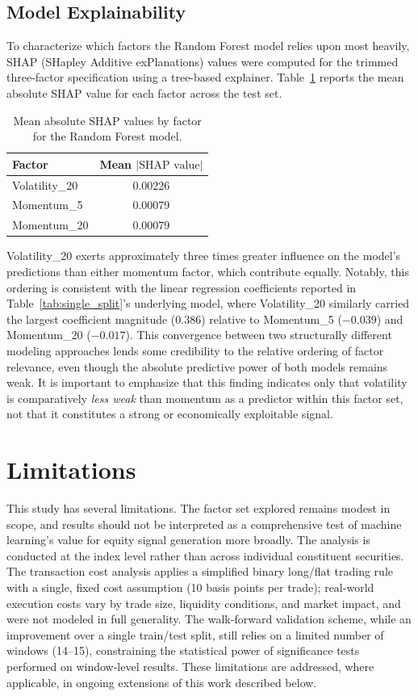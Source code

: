 \documentclass[11pt]{article}
\begin{document}
\subsection{Model Explainability}

To characterize which factors the Random Forest model relies upon most heavily, SHAP (SHapley Additive exPlanations) values were computed for the trimmed three-factor specification using a tree-based explainer. Table~\ref{tab:shap} reports the mean absolute SHAP value for each factor across the test set.

\begin{table}[h]
\centering
\begin{tabular}{lc}
\toprule
Factor & Mean $|\text{SHAP value}|$ \\
\midrule
Volatility\_20 & 0.00226 \\
Momentum\_5 & 0.00079 \\
Momentum\_20 & 0.00079 \\
\bottomrule
\end{tabular}
\caption{Mean absolute SHAP values by factor for the Random Forest model.}
\label{tab:shap}
\end{table}

Volatility\_20 exerts approximately three times greater influence on the model's predictions than either momentum factor, which contribute equally. Notably, this ordering is consistent with the linear regression coefficients reported in Table~\ref{tab:single_split}'s underlying model, where Volatility\_20 similarly carried the largest coefficient magnitude (0.386) relative to Momentum\_5 ($-0.039$) and Momentum\_20 ($-0.017$). This convergence between two structurally different modeling approaches lends some credibility to the relative ordering of factor relevance, even though the absolute predictive power of both models remains weak. It is important to emphasize that this finding indicates only that volatility is comparatively \emph{less weak} than momentum as a predictor within this factor set, not that it constitutes a strong or economically exploitable signal.


\section{Limitations}

This study has several limitations. The factor set explored remains modest in scope, and results should not be interpreted as a comprehensive test of machine learning's value for equity signal generation more broadly. The analysis is conducted at the index level rather than across individual constituent securities. The transaction cost analysis applies a simplified binary long/flat trading rule with a single, fixed cost assumption (10 basis points per trade); real-world execution costs vary by trade size, liquidity conditions, and market impact, and were not modeled in full generality. The walk-forward validation scheme, while an improvement over a single train/test split, still relies on a limited number of windows (14--15), constraining the statistical power of significance tests performed on window-level results. These limitations are addressed, where applicable, in ongoing extensions of this work described below.
\end{document}
